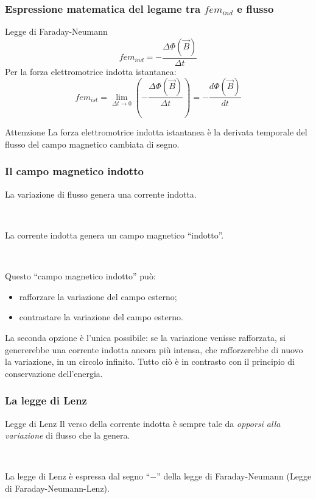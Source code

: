 \documentclass[]{beamer}
\theoremstyle{plain}
\begin{document}
\begin{frame}
  \frametitle{Espressione matematica del legame tra $ fem_{ind} $ e flusso}
\begin{block}{Legge di Faraday-Neumann}
\[ fem_{ind} = - \frac{\Delta \Phi(\vec{B})}{\Delta t} \]\pause
Per la forza elettromotrice indotta istantanea:
\[ fem_{ist} = \lim_{\Delta t \rightarrow 0} \left( - \frac{\Delta \Phi(\vec{B})}{\Delta t} \right) = - \frac{d \Phi(\vec{B})}{d t} \]
\end{block}\pause
\begin{alertblock}{Attenzione}
La forza elettromotrice indotta istantanea è la derivata temporale del flusso del campo magnetico cambiata di segno.
\end{alertblock}
\end{frame}

\begin{frame}
  \frametitle{Il campo magnetico indotto}
  La variazione di flusso genera una corrente indotta.\pause

  ~
  
  La corrente indotta genera un campo magnetico ``indotto''.\pause

  ~
  
  Questo ``campo magnetico indotto'' può:
  \begin{itemize}
    \item rafforzare la variazione del campo esterno;\pause
    \item contrastare la variazione del campo esterno.\pause
  \end{itemize}
  \alert{La seconda opzione è l'unica possibile}: se la variazione venisse rafforzata, si genererebbe una corrente indotta ancora più intensa, che rafforzerebbe di nuovo la variazione, in un circolo infinito. Tutto ciò è in contrasto con il principio di conservazione dell'energia.
\end{frame}

\begin{frame}
  \frametitle{La legge di Lenz}
  \begin{block}{Legge di Lenz}
    Il verso della corrente indotta è sempre tale da \emph{opporsi alla variazione} di flusso che la genera.\pause
  \end{block}

  ~

  La legge di Lenz è espressa dal segno ``$ - $'' della legge di Faraday-Neumann (Legge di Faraday-Neumann-Lenz).
\end{frame}
\end{document}
